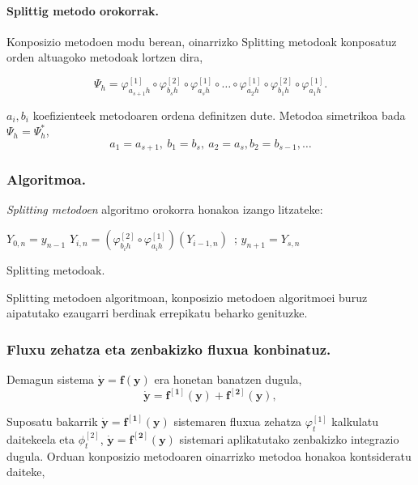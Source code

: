 \paragraph*{\textbf{Splittig metodo orokorrak}.}
Konposizio metodoen modu berean, oinarrizko Splitting metodoak konposatuz orden altuagoko metodoak lortzen dira, 

\begin{equation}
\Psi_h=\varphi^{[1]}_{a_{s+1} h} \circ \varphi^{[2]}_{b_s h} \circ \varphi^{[1]}_{a_s h} \circ \dots \circ \varphi^{[1]}_{a_2 h} \circ \varphi^{[2]}_{b_1 h} \circ \varphi^{[1]}_{a_1 h}.
\end{equation}

$a_i,b_i$ koefizienteek metodoaren ordena definitzen dute. Metodoa simetrikoa bada $\Psi_h=\Psi_h^{*}$,
\begin{equation*}
a_1=a_{s+1}, \ b_1=b_{s}, \ a_2=a_s, b_2=b_{s-1}, \dots
\end{equation*} 

\subsubsection*{Algoritmoa.}
\emph{Splitting metodoen} algoritmo orokorra honakoa izango litzateke:

\begin{algorithm}[H]
 \BlankLine
  {
   \BlankLine
    $Y_{0,n}=y_{n-1} $\;
    \BlankLine
   {
    \BlankLine 
    $Y_{i,n}=(\varphi^{[2]}_{b_i h} \circ \varphi^{[1]}_{a_i h})(Y_{i-1,n})$\ ;
   }
   \BlankLine
    $y_{n+1}=Y_{s,n}$\;
   \BlankLine
 }
 \caption{Splitting metodoak.}
\end{algorithm}

Splitting metodoen algoritmoan, konposizio metodoen algoritmoei buruz aipatutako ezaugarri berdinak errepikatu beharko genituzke. 

\subsubsection*{Fluxu zehatza eta zenbakizko fluxua konbinatuz.}
Demagun sistema $\dot{\mathbf{y}}=\mathbf{f}(\mathbf{y})$ era honetan banatzen dugula,
\begin{equation}
\dot{\mathbf{y}}=\mathbf{f^{[1]}}(\mathbf{y})+\mathbf{f^{[2]}}(\mathbf{y}),
\end{equation} 

Suposatu bakarrik $\dot{\mathbf{y}}=\mathbf{f^{[1]}}(\mathbf{y})$ sistemaren fluxua zehatza $\varphi_t^{[1]}$ kalkulatu daitekeela eta $\phi_t^{[2]}$, $\dot{\mathbf{y}}=\mathbf{f^{[2]}}(\mathbf{y})$ sistemari aplikatutako zenbakizko integrazio dugula. Orduan konposizio metodoaren oinarrizko metodoa honakoa kontsideratu daiteke,

